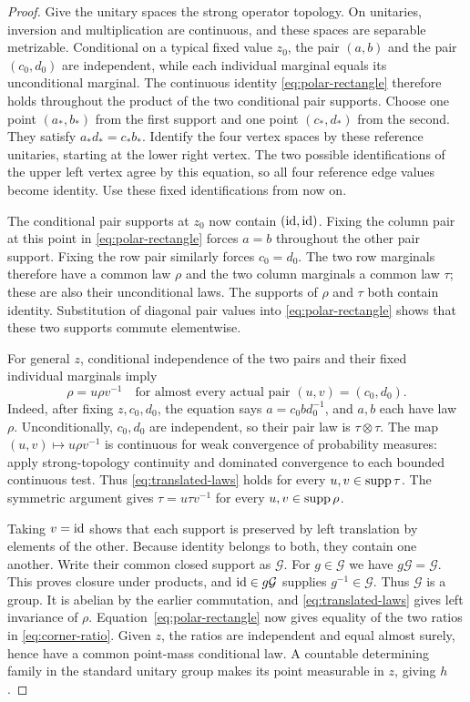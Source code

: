 \begin{proof}
Give the unitary spaces the strong operator topology.  On unitaries,
inversion and multiplication are continuous, and these spaces are
separable metrizable.  Conditional on a typical fixed value $z_0$, the
pair $(a,b)$ and the pair $(c_0,d_0)$ are independent, while each individual
marginal equals its unconditional marginal.  The continuous identity
\eqref{eq:polar-rectangle} therefore holds throughout the product of
the two conditional pair supports.
Choose one point $(a_*,b_*)$ from the first support and one point
$(c_*,d_*)$ from the second.  They satisfy $a_*d_*=c_*b_*$.  Identify the
four vertex spaces by these reference unitaries, starting at the lower
right vertex.  The two possible identifications of the upper left vertex
agree by this equation, so all four reference edge values become identity.
Use these fixed identifications from now on.

The conditional pair supports at $z_0$ now contain $(\operatorname{id},\operatorname{id})$.
Fixing the column pair at this point in \eqref{eq:polar-rectangle}
forces $a=b$ throughout the other pair support.  Fixing the row pair
similarly forces $c_0=d_0$.  The two row marginals therefore have a common
law $\rho$ and the two column marginals a common law $\tau$; these are
also their unconditional laws.  The supports of $\rho$ and $\tau$ both
contain identity.  Substitution of diagonal pair values into
\eqref{eq:polar-rectangle} shows that these two supports commute
elementwise.

For general $z$, conditional independence of the two pairs and their
fixed individual marginals imply
\begin{equation}\label{eq:translated-laws}
 \rho=u\rho v^{-1}
 \quad\text{for almost every actual pair }(u,v)=(c_0,d_0).
\end{equation}
Indeed, after fixing $z,c_0,d_0$, the equation says $a=c_0bd_0^{-1}$,
and $a,b$ each have law $\rho$.  Unconditionally, $c_0,d_0$ are independent,
so their pair law is $\tau\otimes\tau$.  The map
$(u,v)\mapsto u\rho v^{-1}$ is continuous for weak convergence of
probability measures: apply strong-topology continuity and dominated
convergence to each bounded continuous test.  Thus
\eqref{eq:translated-laws} holds for every $u,v\in\operatorname{supp}\tau$.
The symmetric argument gives $\tau=u\tau v^{-1}$ for every
$u,v\in\operatorname{supp}\rho$.

Taking $v=\operatorname{id}$ shows that each support is preserved by left translation
by elements of the other.  Because identity belongs to both, they contain
one another.  Write their common closed support as $\mathcal G$.
For $g\in\mathcal G$ we have $g\mathcal G=\mathcal G$.  This proves closure
under products, and $\operatorname{id}\in g\mathcal G$ supplies $g^{-1}\in\mathcal G$.
Thus $\mathcal G$ is a group.  It is abelian by the earlier commutation,
and \eqref{eq:translated-laws} gives left invariance of $\rho$.
Equation~\eqref{eq:polar-rectangle} now gives equality of the two ratios
in \eqref{eq:corner-ratio}.  Given $z$, the ratios are independent and
equal almost surely, hence have a common point-mass conditional law.
A countable determining family in the standard unitary group makes its
point measurable in $z$, giving $h$.


\end{proof}
